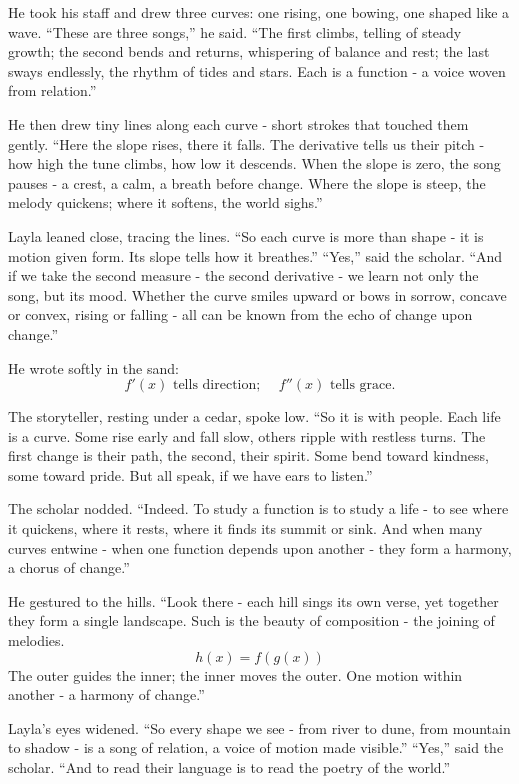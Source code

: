 \documentclass[
  letterpaper,
  DIV=11,
  numbers=noendperiod]{scrreprt}
\begin{document}
He took his staff and drew three curves: one rising, one bowing, one
shaped like a wave. ``These are three songs,'' he said. ``The first
climbs, telling of steady growth; the second bends and returns,
whispering of balance and rest; the last sways endlessly, the rhythm of
tides and stars. Each is a function - a voice woven from relation.''

He then drew tiny lines along each curve - short strokes that touched
them gently. ``Here the slope rises, there it falls. The derivative
tells us their pitch - how high the tune climbs, how low it descends.
When the slope is zero, the song pauses - a crest, a calm, a breath
before change. Where the slope is steep, the melody quickens; where it
softens, the world sighs.''

Layla leaned close, tracing the lines. ``So each curve is more than
shape - it is motion given form. Its slope tells how it breathes.''
``Yes,'' said the scholar. ``And if we take the second measure - the
second derivative - we learn not only the song, but its mood. Whether
the curve smiles upward or bows in sorrow, concave or convex, rising or
falling - all can be known from the echo of change upon change.''

He wrote softly in the sand: \[
f'(x) \text{ tells direction; } \quad f''(x) \text{ tells grace.}
\]

The storyteller, resting under a cedar, spoke low. ``So it is with
people. Each life is a curve. Some rise early and fall slow, others
ripple with restless turns. The first change is their path, the second,
their spirit. Some bend toward kindness, some toward pride. But all
speak, if we have ears to listen.''

The scholar nodded. ``Indeed. To study a function is to study a life -
to see where it quickens, where it rests, where it finds its summit or
sink. And when many curves entwine - when one function depends upon
another - they form a harmony, a chorus of change.''

He gestured to the hills. ``Look there - each hill sings its own verse,
yet together they form a single landscape. Such is the beauty of
composition - the joining of melodies. \[
h(x) = f(g(x))
\] The outer guides the inner; the inner moves the outer. One motion
within another - a harmony of change.''

Layla's eyes widened. ``So every shape we see - from river to dune, from
mountain to shadow - is a song of relation, a voice of motion made
visible.'' ``Yes,'' said the scholar. ``And to read their language is to
read the poetry of the world.''
\end{document}
